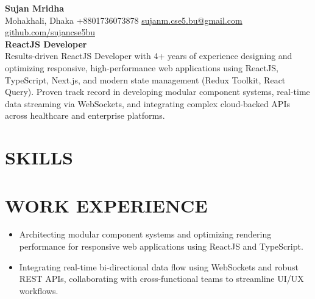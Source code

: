 \documentclass{resume}
\begin{document}
\noindent
{\fontsize{24pt}{28pt}\selectfont\textbf{\color{primary} Sujan Mridha}}\\[4pt]
{\fontsize{9.3pt}{12pt}\selectfont\color{contactgray} Mohakhali, Dhaka \;\textbullet\; +8801736073878 \;\textbullet\; \href{mailto:sujanm.cse5.bu@gmail.com}{sujanm.cse5.bu@gmail.com} \;\textbullet\; \href{https://github.com/sujancse5bu}{github.com/sujancse5bu}}\\[9pt]
{\fontsize{11.5pt}{14pt}\selectfont\textbf{ReactJS Developer}}\\[4pt]
{\fontsize{9.3pt}{13.5pt}\selectfont Results-driven ReactJS Developer with 4+ years of experience designing and optimizing responsive, high-performance web applications using ReactJS, TypeScript, Next.js, and modern state management (Redux Toolkit, React Query). Proven track record in developing modular component systems, real-time data streaming via WebSockets, and integrating complex cloud-backed APIs across healthcare and enterprise platforms.}\par

\section{SKILLS}


\section{WORK EXPERIENCE}

\begin{itemize}
    \item Architecting modular component systems and optimizing rendering performance for responsive web applications using ReactJS and TypeScript.
    \item Integrating real-time bi-directional data flow using WebSockets and robust REST APIs, collaborating with cross-functional teams to streamline UI/UX workflows.
\end{itemize}
\vspace{6pt}
\end{document}
